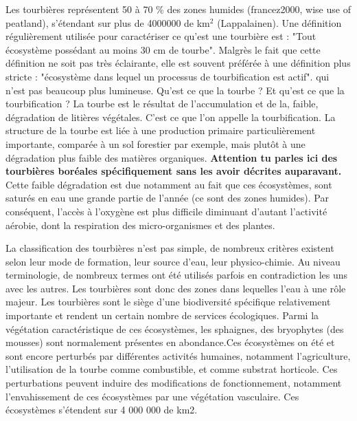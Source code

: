 Les tourbières représentent 50 à 70 \% des zones humides (francez2000, wise use of peatland), s'étendant sur plus de 4000000 de km$^{2}$ (Lappalainen).
Une définition régulièrement utilisée pour caractériser ce qu'est une tourbière est : "Tout écosystème possédant au moins 30 cm de tourbe".
Malgrès le fait que cette définition ne soit pas très éclairante, elle est souvent préférée à une définition plus stricte : "écosystème dans lequel un processus de tourbification est actif". qui n'est pas beaucoup plus lumineuse.
Qu'est ce que la tourbe ?
Et qu'est ce que la tourbification ?
La tourbe est le résultat de l'accumulation et de la, faible, dégradation de litières végétales.
C'est ce que l'on appelle la tourbification.
La structure de la tourbe est liée à une production primaire particulièrement importante, comparée à un sol forestier par exemple, mais plutôt à une dégradation plus faible des matières organiques.
\textbf{Attention tu parles ici des tourbières boréales spécifiquement sans les avoir décrites auparavant.}
Cette faible dégradation est due notamment au fait que ces écosystèmes, sont saturés en eau une grande partie de l'année (ce sont des zones humides). 
Par conséquent, l'accès à l'oxygène est plus difficile diminuant d'autant l'activité aérobie, dont la respiration des micro-organismes et des plantes.

La classification des tourbières n'est pas simple, de nombreux critères existent selon leur mode de formation, leur source d'eau, leur physico-chimie.
Au niveau terminologie, de nombreux termes ont été utilisés parfois en contradiction les uns avec les autres.
Les tourbières sont donc des zones dans lequelles l'eau à une rôle majeur.
Les tourbières sont le siège d'une biodiversité spécifique relativement importante et rendent un certain nombre de services écologiques.
Parmi la végétation caractéristique de ces écosystèmes, les sphaignes, des bryophytes (des mousses) sont normalement présentes en abondance.Ces écosystèmes on été et sont encore perturbés par différentes activités humaines, notamment l'agriculture, l'utilisation de la tourbe comme combustible, et comme substrat horticole.
Ces perturbations peuvent induire des modifications de fonctionnement, notamment l'envahissement de ces écosystèmes par une végétation vasculaire.
Ces écosystèmes s'étendent sur 4 000 000 de km2.

